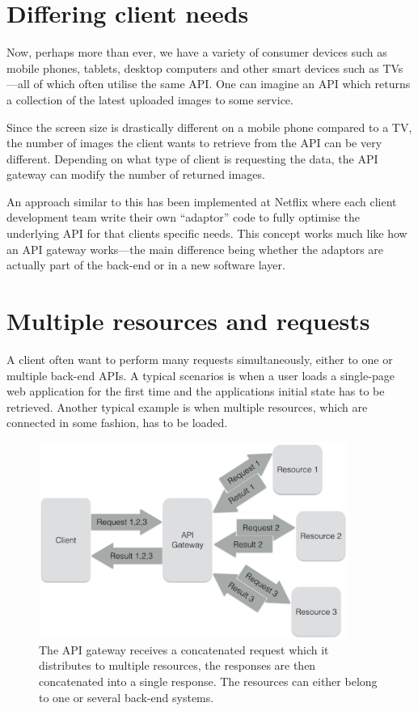 \documentclass{cslthse-msc}
\begin{document}
\section{Differing client needs}
Now, perhaps more than ever, we have a variety of consumer devices such as mobile phones, tablets, desktop computers and other smart devices such as TVs---all of which often utilise the same API. One can imagine an API which returns a collection of the latest uploaded images to some service. 

Since the screen size is drastically different on a mobile phone compared to a TV, the number of images the client wants to retrieve from the API can be very different. Depending on what type of client is requesting the data, the API gateway can modify the number of returned images.

An approach similar to this has been implemented at Netflix where each client development team write their own \enquote{adaptor} code to fully optimise the underlying API for that clients specific needs\cite{netflix}. This concept works much like how an API gateway works---the main difference being whether the adaptors are actually part of the back-end or in a new software layer.

\section{Multiple resources and requests}
A client often want to perform many requests simultaneously, either to one or multiple back-end APIs. A typical scenarios is when a user loads a single-page web application for the first time and the applications initial state has to be retrieved. Another typical example is when multiple resources, which are connected in some fashion, has to be loaded.

\begin{figure}[H]
  \centering
    \begin{center}
      \includegraphics[width=0.9\textwidth]{images/api_gateway_concatenation.png}
    \end{center}
  \caption{The API gateway receives a concatenated request which it distributes to multiple resources, the responses are then concatenated into a single response. The resources can either belong to one or several back-end systems.}
\end{figure}
\end{document}
